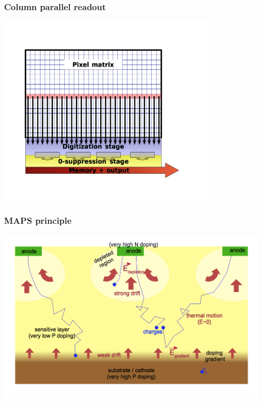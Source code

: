 \documentclass{beamer}
\begin{document}

  \begin{frame}[plain]
    \frametitle{Column parallel readout}

    \begin{center}
      \includegraphics[width = 0.8\textwidth]{Pictures/parallelColumnPrinciple_2bis.png}
    \end{center}
  \end{frame}


  \begin{frame}[plain]
    \frametitle{MAPS principle}

    \begin{center}
      \includegraphics[width = \textwidth]{Pictures/collectionEfield.png}
    \end{center}
  \end{frame}
\end{document}
